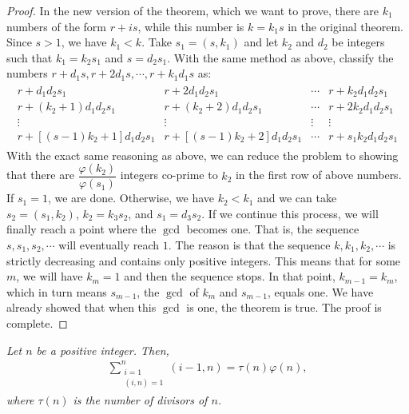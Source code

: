 \documentclass[12pt]{subfile}
\begin{document}
\begin{proof}
			In the new version of the theorem, which we want to prove, there are $k_1$ numbers of the form $r+is$, while this number is $k=k_1s$ in the original theorem. Since $s>1$, we have $k_1<k$. Take $s_1 = (s,k_1)$ and let $k_2$ and $d_2$ be integers such that $k_1 = k_2s_1$ and $s=d_2s_1$. With the same method as above, classify the numbers $r+d_1s, r+2d_1s, \cdots, r+k_1d_1s$ as:
				\begin{align*}
					\begin{matrix}
						r+d_1d_2s_1&r+2d_1d_2s_1&\cdots&r+k_2d_1d_2s_1\\
						r+(k_2+1)d_1d_2s_1&r+(k_2+2)d_1d_2s_1&\cdots&r+2k_2d_1d_2s_1\\
						\vdots&\vdots&\vdots&\vdots\\
						r+[(s-1)k_2+1]d_1d_2s_1&r+[(s-1)k_2+2]d_1d_2s_1&\cdots&r+s_1k_2d_1d_2s_1
					\end{matrix}
				\end{align*}
			With the exact same reasoning as above, we can reduce the problem to showing that there are $\dfrac{\varphi(k_2)}{\varphi(s_1)}$ integers co-prime to $k_2$ in the first row of above numbers. If $s_1=1$, we are done. Otherwise, we have $k_2<k_1$ and we can take $s_2=(s_1,k_2)$, $k_2=k_3s_2$, and $s_1=d_3s_2$. If we continue this process, we will finally reach a point where the $\gcd$ becomes one. That is, the sequence $s, s_1, s_2, \cdots$ will eventually reach $1$. The reason is that the sequence $k, k_1, k_2, \cdots$ is strictly decreasing and contains only positive integers. This means that for some $m$, we will have $k_m=1$ and then the sequence stops. In that point, $k_{m-1} = k_m$, which in turn means $s_{m-1}$, the $\gcd$ of $k_{m}$ and $s_{m-1}$, equals one. We have already showed that when this $\gcd$ is one, the theorem is true. The proof is complete.
		\end{proof}

		\begin{theorem}\slshape
			Let $n$ be a positive integer. Then,
				\begin{align*}
					\sum_{\substack{i=1\\(i,n)=1}}^{n}(i-1,n)=\tau(n)\varphi(n),
				\end{align*}
			where $\tau(n)$ is the number of divisors of $n$.
		\end{theorem}
\end{document}
